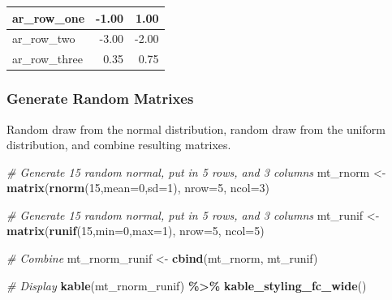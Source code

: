 \documentclass[
]{book}
\newenvironment{Shaded}{\begin{snugshade}}{\end{snugshade}}
\newcommand{\CommentTok}[1]{\textcolor[rgb]{0.56,0.35,0.01}{\textit{#1}}}
\newcommand{\DataTypeTok}[1]{\textcolor[rgb]{0.13,0.29,0.53}{#1}}
\newcommand{\DecValTok}[1]{\textcolor[rgb]{0.00,0.00,0.81}{#1}}
\newcommand{\KeywordTok}[1]{\textcolor[rgb]{0.13,0.29,0.53}{\textbf{#1}}}
\newcommand{\NormalTok}[1]{#1}
\newcommand{\OperatorTok}[1]{\textcolor[rgb]{0.81,0.36,0.00}{\textbf{#1}}}
\newcommand{\StringTok}[1]{\textcolor[rgb]{0.31,0.60,0.02}{#1}}
\begin{document}
\begin{table}[!h]
\centering
\begin{tabular}{l|r|r}
\hline
ar\_row\_one & -1.00 & 1.00\\
\hline
\rowcolor{gray!6}  ar\_row\_two & -3.00 & -2.00\\
\hline
ar\_row\_three & 0.35 & 0.75\\
\hline
\end{tabular}
\end{table}

\hypertarget{generate-random-matrixes}{%
\subsubsection{Generate Random Matrixes}\label{generate-random-matrixes}}

Random draw from the normal distribution, random draw from the uniform distribution, and combine resulting matrixes.

\begin{Shaded}
\begin{Highlighting}[]
\CommentTok{\# Generate 15 random normal, put in 5 rows, and 3 columns}
\NormalTok{mt\_rnorm \textless{}{-}}\StringTok{ }\KeywordTok{matrix}\NormalTok{(}\KeywordTok{rnorm}\NormalTok{(}\DecValTok{15}\NormalTok{,}\DataTypeTok{mean=}\DecValTok{0}\NormalTok{,}\DataTypeTok{sd=}\DecValTok{1}\NormalTok{), }\DataTypeTok{nrow=}\DecValTok{5}\NormalTok{, }\DataTypeTok{ncol=}\DecValTok{3}\NormalTok{)}

\CommentTok{\# Generate 15 random normal, put in 5 rows, and 3 columns}
\NormalTok{mt\_runif \textless{}{-}}\StringTok{ }\KeywordTok{matrix}\NormalTok{(}\KeywordTok{runif}\NormalTok{(}\DecValTok{15}\NormalTok{,}\DataTypeTok{min=}\DecValTok{0}\NormalTok{,}\DataTypeTok{max=}\DecValTok{1}\NormalTok{), }\DataTypeTok{nrow=}\DecValTok{5}\NormalTok{, }\DataTypeTok{ncol=}\DecValTok{5}\NormalTok{)}

\CommentTok{\# Combine}
\NormalTok{mt\_rnorm\_runif \textless{}{-}}\StringTok{ }\KeywordTok{cbind}\NormalTok{(mt\_rnorm, mt\_runif)}

\CommentTok{\# Display}
\KeywordTok{kable}\NormalTok{(mt\_rnorm\_runif) }\OperatorTok{\%\textgreater{}\%}
\StringTok{  }\KeywordTok{kable\_styling\_fc\_wide}\NormalTok{()}
\end{Highlighting}
\end{Shaded}
\end{document}
